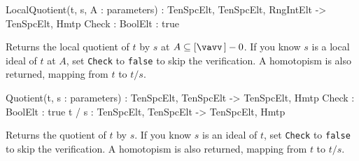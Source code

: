 \begin{intrinsics}
LocalQuotient(t, s, A : parameters) : TenSpcElt, TenSpcElt, {RngIntElt} -> TenSpcElt, Hmtp
    Check : BoolElt : true
\end{intrinsics}

Returns the local quotient of $t$ by $s$ at $A\subseteq[\vav]-0$. If you know $s$ is a local 
ideal of $t$ at $A$, set {\tt Check} to {\tt false} to skip the verification.
A homotopism is also returned, mapping from $t$ to $t/s$.

\begin{intrinsics}
Quotient(t, s : parameters) : TenSpcElt, TenSpcElt -> TenSpcElt, Hmtp
    Check : BoolElt : true
t / s : TenSpcElt, TenSpcElt -> TenSpcElt, Hmtp
\end{intrinsics}

Returns the quotient of $t$ by $s$. If you know $s$ is an ideal of $t$, 
set {\tt Check} to {\tt false} to skip the verification.
A homotopism is also returned, mapping from $t$ to $t/s$.

